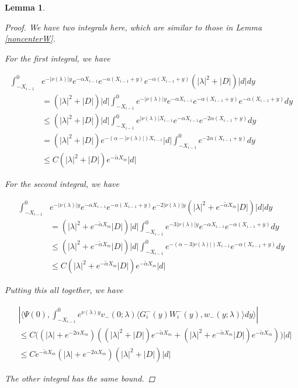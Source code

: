 \documentclass[12pt]{article}
\newtheorem{lemma}{Lemma}
\begin{document}
\begin{lemma}
\begin{proof}
We have two integrals here, which are similar to those in Lemma \ref{noncenterW}.

For the first integral, we have

\begin{align*}
\int_{-X_{i-1}}^0 &e^{-|\nu(\lambda)|y} e^{-\alpha X_{i-1}} e^{-\alpha(X_{i-1} + y)} e^{-\alpha(X_{i-1} + y)}( |\lambda|^2 + |D|)|d| dy \\
&= ( |\lambda|^2 + |D|)|d| \int_{-X_{i-1}}^0 e^{-|\nu(\lambda)|y} e^{-\alpha X_{i-1}} e^{-\alpha(X_{i-1} + y)} e^{-\alpha(X_{i-1} + y)} dy \\
&\leq ( |\lambda|^2 + |D|)|d| \int_{-X_{i-1}}^0 e^{|\nu(\lambda)|X_{i-1}} e^{-\alpha X_{i-1}} e^{-2\alpha(X_{i-1} + y)} dy \\
&= ( |\lambda|^2 + |D|) e^{-(\alpha - |\nu(\lambda)|)X_{i-1}} |d| \int_{-X_{i-1}}^0 e^{-2\alpha(X_{i-1} + y)} dy \\
&\leq C ( |\lambda|^2 + |D|) e^{-\tilde{\alpha}X_m} |d|
\end{align*}

For the second integral, we have

\begin{align*}
\int_{-X_{i-1}}^0 & e^{-|\nu(\lambda)|y} e^{-\alpha X_{i-1}} e^{-\alpha(X_{i-1} + y)} e^{-2|\nu(\lambda)|y}( |\lambda|^2 + e^{-\tilde{\alpha} X_m}|D|) |d| dy \\
&= ( |\lambda|^2 + e^{-\tilde{\alpha} X_m}|D|)|d|\int_{-X_{i-1}}^0 e^{-3 |\nu(\lambda)|y} e^{-\alpha X_{i-1}} e^{-\alpha(X_{i-1} + y)} dy \\
&\leq ( |\lambda|^2 + e^{-\tilde{\alpha} X_m}|D|)|d|\int_{-X_{i-1}}^0 e^{-(\alpha - 3 |\nu(\lambda)|) X_{i-1}} e^{-\alpha(X_{i-1} + y)} dy \\
&\leq C ( |\lambda|^2 + e^{-\tilde{\alpha} X_m}|D|)e^{-\tilde{\alpha}X_m}|d|
\end{align*}

Putting this all together, we have

\begin{align*}
&\left| \langle \Psi(0), \int_{-X_{i-1}}^0
e^{\nu(\lambda)y} v_-(0; \lambda) \langle G_i^-(y)W_i^-(y), w_-(y; \lambda) \rangle dy \rangle \right| \\
&\leq C \Big( (|\lambda| + e^{-2 \alpha X_m}) (( |\lambda|^2 + |D|) e^{-\tilde{\alpha}X_m} + ( |\lambda|^2 + e^{-\tilde{\alpha} X_m}|D|)e^{-\tilde{\alpha}X_m}) \Big) |d| \\
&\leq C e^{-\tilde{\alpha}X_m} ( |\lambda| + e^{-2\alpha X_m} )( |\lambda|^2 + |D|)|d|
\end{align*}

The other integral has the same bound.

\end{proof}
\end{lemma}
\end{document}
